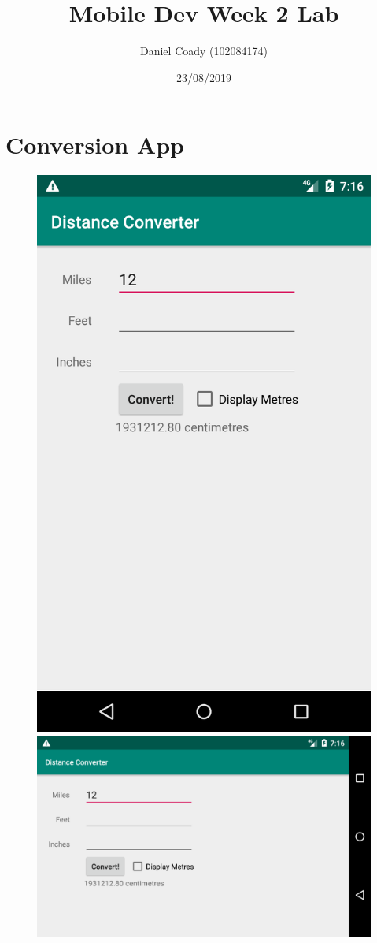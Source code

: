 \documentclass{scrartcl}
\title{Mobile Dev Week 2 Lab}
\author{Daniel Coady (102084174)}
\date{23/08/2019}
\begin{document}
\maketitle

\section*{Conversion App}

\begin{figure}[h]
    \centering
    \includegraphics[scale=0.2]{images/portrait.png}
    \includegraphics[scale=0.2]{images/landscape.png}

\end{figure}
\end{document}
